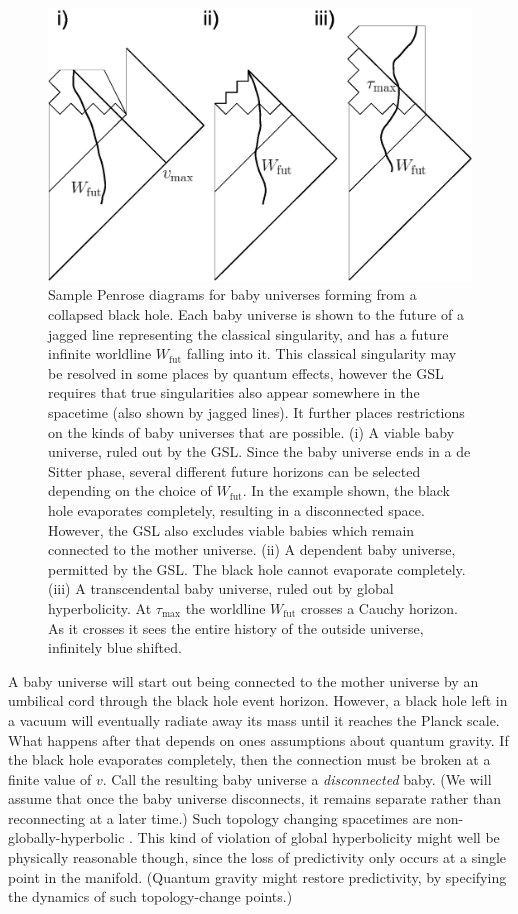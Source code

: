 \documentclass{article}
\begin{document}
\begin{figure}[ht]
\centering
\includegraphics[width=.8\textwidth]{babies.eps}
\caption{\small{
Sample Penrose diagrams for baby universes forming from a collapsed black hole.  Each baby universe is shown to the future of a jagged line representing the classical singularity, and has a future infinite worldline $W_\mathrm{fut}$ falling into it.  This classical singularity may be resolved in some places by quantum effects, however the GSL requires that true singularities also appear somewhere in the spacetime (also shown by jagged lines).  It further places restrictions on the kinds of baby universes that are possible.  (i) A viable baby universe, ruled out by the GSL.  Since the baby universe ends in a de Sitter phase, several different future horizons can be selected depending on the choice of $W_\mathrm{fut}$.  In the example shown, the black hole evaporates completely, resulting in a disconnected space.  However, the GSL also excludes viable babies which remain connected to the mother universe.  (ii) A dependent baby universe, permitted by the GSL.  The black hole cannot evaporate completely.  (iii) A transcendental baby universe, ruled out by global hyperbolicity.  At $\tau_\mathrm{max}$ the worldline $W_\mathrm{fut}$ crosses a Cauchy horizon.  As it crosses it sees the entire history of the outside universe, infinitely blue shifted.
}}\label{babies}
\end{figure}

\noindent A baby universe will start out being connected to the mother universe by an umbilical cord through the black hole event horizon.  However, a black hole left in a vacuum will eventually radiate away its mass until it reaches the Planck scale.  What happens after that depends on ones assumptions about quantum gravity.  If the black hole evaporates completely, then the connection must be broken at a finite value of $v$.  Call the resulting baby universe a \textit{disconnected} baby.  (We will assume that once the baby universe disconnects, it remains separate rather than reconnecting at a later time.)  Such topology changing spacetimes are non-globally-hyperbolic \cite{geroch}.  This kind of violation of global hyperbolicity might well be physically reasonable though, since the loss of predictivity only occurs at a single point in the manifold.  (Quantum gravity might restore predictivity, by specifying the dynamics of such topology-change points.)
\end{document}
